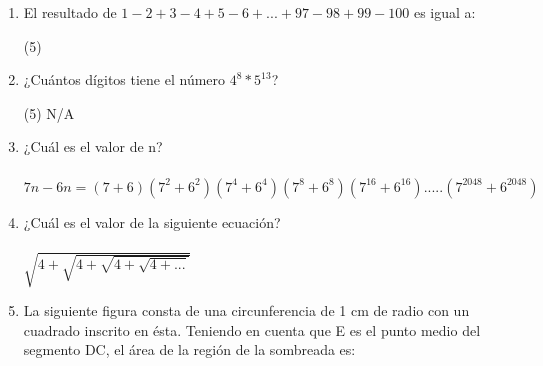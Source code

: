 \documentclass{article}
\begin{document}
\begin{enumerate}
\begin{tasks}[label=\Alph*.]
          \end{tasks}
    \item El resultado de $1-2+3-4+5-6+...+97-98+99-100$ es igual a: \\ \begin{tasks}[label=\Alph*.](5)
          \end{tasks}
    \item ¿Cuántos dígitos tiene el número $4^8 * 5^{13}$? \\ \begin{tasks}[label=\Alph*.](5)
              \task N/A
          \end{tasks}
    \item ¿Cuál es el valor de n?  \\~\\ $7n-6n=(7+6)(7^2+6^2)(7^4+6^4)(7^8+6^8)(7^{16}+6^{16}).....(7^{2048}+6^{2048})$
    \item ¿Cuál es el valor de la siguiente ecuación? \\~\\ $\sqrt{4+\sqrt{4+\sqrt{4+\sqrt{4+...}}}}$

          \newpage
    \item{La siguiente figura consta de una circunferencia de 1 cm de radio con un cuadrado inscrito en ésta. Teniendo en cuenta que E es el punto medio del segmento DC, el área de la región de la sombreada es: \\ \begin{center} 
\end{center}}
\end{enumerate}
\end{document}
